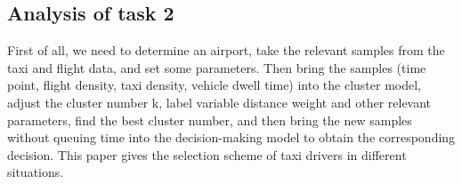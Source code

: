 %   
%  
%  
%  

\subsection{Analysis of task 2}

\par First of all, we need to determine an airport, take the relevant samples from the taxi and flight data, and set some parameters. Then bring the samples (time point, flight density, taxi density, vehicle dwell time) into the cluster model, adjust the cluster number k, label variable distance weight and other relevant parameters, find the best cluster number, and then bring the new samples without queuing time into the decision-making model to obtain the corresponding decision. This paper gives the selection scheme of taxi drivers in different situations. 


